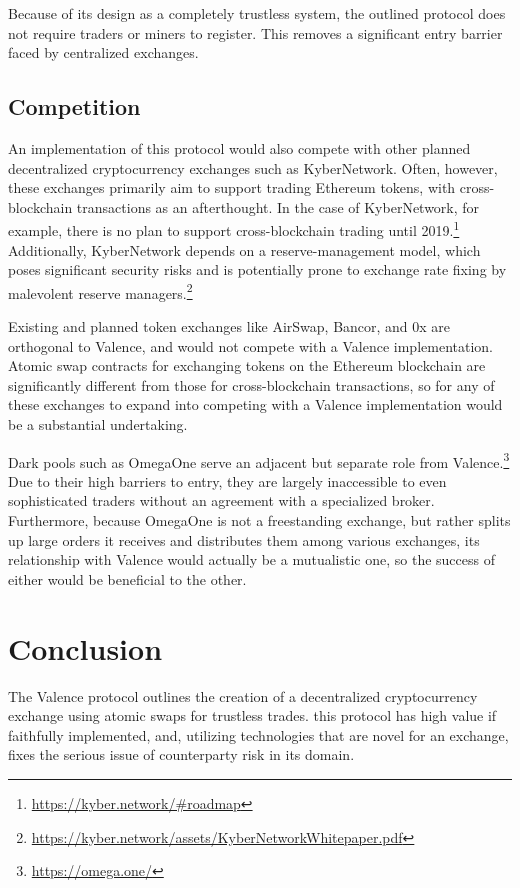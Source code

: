 \documentclass[a4paper]{article}
\begin{document}
    Because of its design as a completely trustless system, the outlined
    protocol does not require traders or miners to register. This removes a
    significant entry barrier faced by centralized exchanges.
		
  \subsection*{Competition}
    An implementation of this protocol would also compete with other planned decentralized cryptocurrency exchanges such as KyberNetwork. Often, however, these exchanges primarily aim to support trading Ethereum tokens, with cross-blockchain transactions as an afterthought. In the case of KyberNetwork, for example, there is no plan to support cross-blockchain trading until 2019.\footnote[7]{\url{https://kyber.network/\#roadmap}} Additionally, KyberNetwork depends on a reserve-management model, which poses significant security risks and is potentially prone to exchange rate fixing by malevolent reserve managers.\footnote[8]
        {\url{https://kyber.network/assets/KyberNetworkWhitepaper.pdf}}

    Existing and planned token exchanges like AirSwap, Bancor, and 0x are orthogonal to Valence, and would not compete with a Valence implementation. Atomic swap contracts for exchanging tokens on the Ethereum blockchain are significantly different from those for cross-blockchain transactions, so for any of these exchanges to expand into competing with a Valence implementation would be a substantial undertaking.

    Dark pools such as OmegaOne serve an adjacent but separate role from Valence.\footnote[9]
    {\url{https://omega.one/}} Due to their high barriers to entry, they are largely inaccessible to even sophisticated traders without an agreement with a specialized broker. Furthermore, because OmegaOne is not a freestanding exchange, but rather splits up large orders it receives and distributes them among various exchanges, its relationship with Valence would actually be a mutualistic one, so the success of either would be beneficial to the other.

\section*{Conclusion}
	The Valence protocol outlines the creation of a
    decentralized
    cryptocurrency exchange using atomic swaps for trustless trades.
    this protocol has high value if
    faithfully implemented, and, utilizing technologies that are
    novel for an exchange, fixes the serious issue of
    counterparty risk in its domain.
\end{document}
